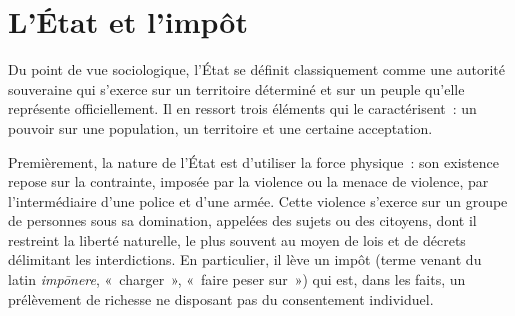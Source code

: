 %

\section*{L'État et l'impôt}

Du point de vue sociologique, l'État se définit classiquement comme une autorité souveraine qui s'exerce sur un territoire déterminé et sur un peuple qu'elle représente officiellement. Il en ressort trois éléments qui le caractérisent~: un pouvoir sur une population, un territoire et une certaine acceptation.

Premièrement, la nature de l'État est d'utiliser la force physique~: son existence repose sur la contrainte, imposée par la violence ou la menace de violence, par l'intermédiaire d'une police et d'une armée. Cette violence s'exerce sur un groupe de personnes sous sa domination, appelées des sujets ou des citoyens, dont il restreint la liberté naturelle, le plus souvent au moyen de lois et de décrets délimitant les interdictions. En particulier, il lève un impôt (terme venant du latin \emph{impōnere}, «~charger~», «~faire peser sur~») qui est, dans les faits, un prélèvement de richesse ne disposant pas du consentement individuel. %

